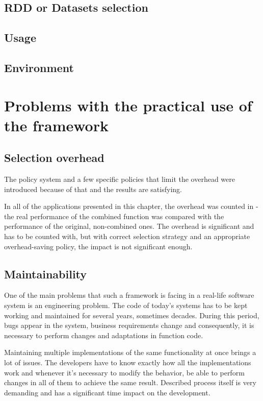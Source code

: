 \subsection{RDD or Datasets selection}
\subsection{Usage}
\subsection{Environment}

\section{Problems with the practical use of the framework}

\subsection{Selection overhead}

The policy system and a few specific policies that limit the overhead were introduced because of that and the results are satisfying.

In all of the applications presented in this chapter, the overhead was counted in - the real performance of the combined function was compared with the performance of the original, non-combined ones. The overhead is significant and has to be counted with, but with correct selection strategy and an appropriate overhead-saving policy, the impact is not significant enough.

\subsection{Maintainability}

One of the main problems that such a framework is facing in a real-life software system is an engineering problem. The code of today's systems has to be kept working and maintained for several years, sometimes decades. During this period, bugs appear in the system, business requirements change and consequently, it is necessary to perform changes and adaptations in function code.

Maintaining multiple implementations of the same functionality at once brings a lot of issues. The developers have to know exactly how all the implementations work and whenever it's necessary to modify the behavior, be able to perform changes in all of them to achieve the same result. Described process itself is very demanding and has a significant time impact on the development. 

